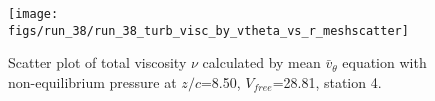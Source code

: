 \begin{figure}[H]
\centering
\texttt{[image: figs/run\_38/run\_38\_turb\_visc\_by\_vtheta\_vs\_r\_meshscatter]}
\caption{Scatter plot of total viscosity $\nu$ calculated by mean $\bar{v}_{\theta}$ equation with non-equilibrium pressure at $z/c$=8.50, $V_{free}$=28.81, station 4.}
\label{fig:run_38_turb_visc_by_vtheta_vs_r_meshscatter}
\end{figure}



